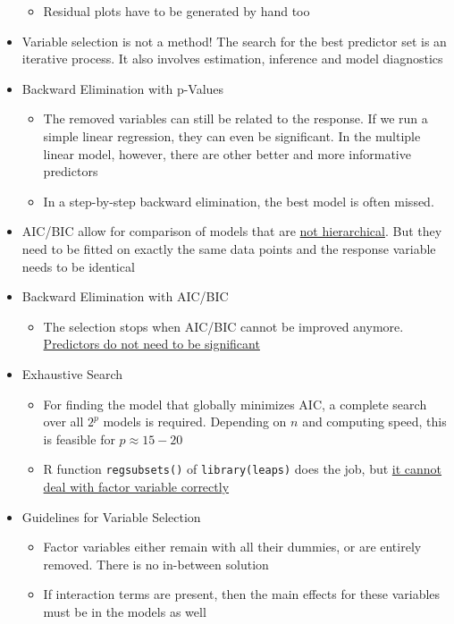 \documentclass[a4paper]{article}
\begin{document}
\begin{itemize}
\begin{itemize}
        \item Residual plots have to be generated by hand too
    \end{itemize}
    \item Variable selection is not a method! The search for the best predictor set is an iterative process. It also involves estimation, inference and model diagnostics
    \item Backward Elimination with p-Values
    \begin{itemize}
        \item The removed variables can still be related to the response. If we run a simple linear regression, they can even be significant. In the multiple linear model, however, there are other better and more informative predictors
        \item In a step-by-step backward elimination, the best model is often missed.
    \end{itemize}
    \item AIC/BIC allow for comparison of models that are \underline{not hierarchical}. But they need to be fitted on exactly the same data points and the response variable needs to be identical
    \item Backward Elimination with AIC/BIC
    \begin{itemize}
        \item The selection stops when AIC/BIC cannot be improved anymore. \underline{Predictors do not need to be significant}
    \end{itemize}
    \item Exhaustive Search
    \begin{itemize}
        \item For finding the model that globally minimizes AIC, a complete search over all $2^p$ models is required. Depending on $n$ and computing speed, this is feasible for $p\approx15-20$
        \item R function \texttt{regsubsets()} of \texttt{library(leaps)} does the job, but \underline{it cannot deal with factor variable correctly}
    \end{itemize}
    \item Guidelines for Variable Selection
    \begin{itemize}
        \item Factor variables either remain with all their dummies, or are entirely removed. There is no in-between solution
        \item If interaction terms are present, then the main effects for these variables must be in the models as well

\end{itemize}
\end{itemize}
\end{document}
